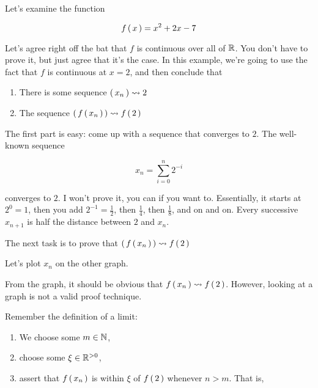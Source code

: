 \begin{example}
  Let's examine the function

  \begin{equation}
    f \left(\, x \,\right) = x^2 + 2x - 7
  \end{equation}


  Let's agree right off the bat that $f$ is continuous over all of $\mathbb{R}$. You
  don't have to prove it, but just agree that it's the case. In this example,
  we're going to use the fact that $f$ is continuous at $x = 2$, and then
  conclude that

  \begin{enumerate}
  \item There is some sequence $\left(\, x_n \,\right) \leadsto 2$
  \item The sequence $\left(\, f \left(\, x_n \,\right) \,\right) \leadsto f \left(\, 2 \,\right)$
  \end{enumerate}

  The first part is easy: come up with a sequence that converges to $2$. The
  well-known sequence

  \begin{equation}
    x_n = \sum_{i = 0}^n 2^{-i}
  \end{equation}

  converges to $2$. I won't prove it, you can if you want to. Essentially, it
  starts at $2^0 = 1$, then you add $2^{-1} = \frac{1}{2}$, then $\frac{1}{4}$,
  then $\frac{1}{8}$, and on and on. Every successive $x_{n+1}$ is half the
  distance between $2$ and $x_n$.


  The next task is to prove that $\left(\, f \left(\, x_n \,\right) \,\right) \leadsto f \left(\, 2 \,\right)$

  Let's plot $x_n$ on the other graph.


  From the graph, it should be obvious that $f \left(\, x_n \,\right) \leadsto
  f \left(\, 2 \,\right)$. However, looking at a graph is not a valid proof technique.

  Remember the definition of a limit:

  \begin{enumerate}
  \item We choose some $m \in \mathbb{N}$,
  \item choose some $\xi \in \mathbb{R}^{>0}$,
  \item assert that $f \left(\, x_n \,\right)$ is within $\xi$ of $f \left(\, 2 \,\right)$ whenever $n >
    m$. That is,


\end{enumerate}
\end{example}
